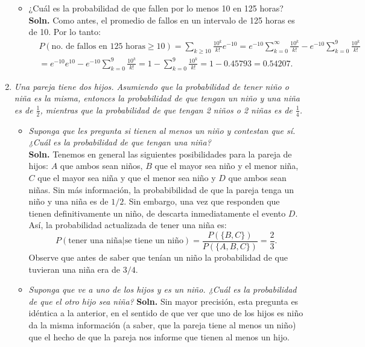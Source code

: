 \documentclass[letterpaper,11pt]{article}
\begin{document}
\begin{enumerate}
\begin{itemize}
    \item ¿Cuál es la probabilidad de que fallen por lo menos 10 en 125 horas?\\
    {\bf Soln.} Como antes, el promedio de fallos en un intervalo de 125 horas es de 10. Por lo tanto:
    \begin{align*}
    &P(\text{no. de fallos en 125 horas} \geq 10)=
    \sum_{k\geq 10}\frac{10^k}{k!}e^{-10}=e^{-10}\sum_{k=0}^\infty \frac{10^k}{k!}-e^{-10}\sum
        _{k=0}^{9}\frac{10^k}{k!}\\
        & = e^{-10}e^{10}-e^{-10}\sum_{k=0}^{9}\frac{10^k}{k!}= 1- \sum
        _{k=0}^{9}\frac{10^k}{k!}=1-0.45793=0.54207.
    \end{align*}
    \end{itemize}
\item \emph{Una pareja tiene dos hijos. Asumiendo que la probabilidad de tener niño o niña es la misma,
        entonces la probabilidad de que tengan un niño y una niña es de $\frac{1}{2}$, mientras que la 
    probabilidad de que tengan 2 niños o 2 niñas es de $\frac{1}{4}$.}
\begin{itemize}
    \item \emph{Suponga que les pregunta si tienen al menos un niño y contestan que sí. ¿Cuál es 
            la probabilidad de que tengan una niña?}\\
    {\bf Soln.} Tenemos en general las siguientes posibilidades para la pareja de hijos: $A$ que ambos sean
    niños, $B$ que el mayor sea niño y el menor niña, $C$ que el mayor sea niña y que el menor sea niño y $D$
    que ambos sean niñas. Sin más información, la probabibilidad de que la pareja tenga un niño y una niña es
    de $1/2$. Sin embargo, una vez que responden que tienen definitivamente un niño, de descarta
    inmediatamente el evento $D$. Así, la probabilidad actualizada de tener una niña es: 
    \[P(\text{tener una niña}|\text{se tiene un niño})=\frac{P(\{B,C\})}{P(\{A,B,C\})}=\frac{2}{3}.\]
    Observe que antes de saber que tenían un niño la probabilidad de que tuvieran una niña era de $3/4$.
    
    \item \emph{Suponga que ve a uno de los hijos y es un niño. ¿Cuál es la probabilidad de que el otro
        hijo sea niña?}
        {\bf Soln.}  Sin mayor precisión, esta pregunta es idéntica a la anterior, en el sentido de que ver
        que uno de los hijos es niño da la misma información (a saber, que la pareja tiene al menos un 
        niño) que el hecho de que la pareja nos informe que tienen al menos un hijo. 


\end{itemize}
\end{enumerate}
\end{document}
